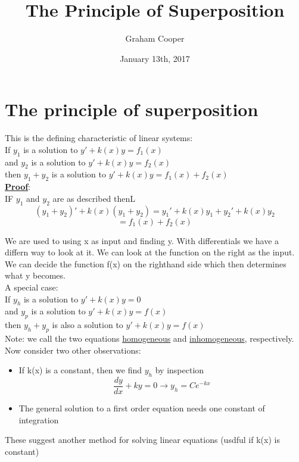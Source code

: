 \documentclass[12pt]{article}
\title{\vspace{-15ex}The Principle of Superposition\vspace{-1ex}}
\date{January 13th, 2017}
\author{Graham Cooper}
\newcommand{\myt}[1]{\textbf{\underline{#1}}}
\begin{document}
	\maketitle
	
	\section*{The principle of superposition}
	This is the defining characteristic of linear systems:\\
	If $y_1$ is a solution to $y' + k(x)y = f_1(x)$\\
	and $y_2$ is a solution to $y' + k(x)y = f_2(x)$\\
	then $y_1 + y_2$ is a solution to $y' + k(x)y = f_1(x) + f_2(x)$\\
	
	\myt{Proof}:\\
	IF $y_1$ and $y_2$ are as described thenL\\
	$$(y_1 + y_2)' + k(x)(y_1 + y_2) = y_1'+k(x)y_1 + y_2' + k(x)y_2$$
	$$ = f_1(x) + f_2(x)$$
	
	We are used to using x as input and finding y. With differentials we have a differn way to look at it. We can look at the function on the right as the input. We can decide the function f(x) on the righthand side which then determines what y becomes.\\
	
	A special case:\\
	If $y_h$ is a solution to $y' + k(x)y = 0$\\
	and $y_p$ is a solution to $y' + k(x)y = f(x)$\\
	then $y_h + y_p$ is also a solution to $y' + k(x)y = f(x)$\\
	
	Note: we call the two equations \underline{homogeneous} and \underline{inhomogeneous}, respectively.\\
	
	Now consider two other observations:\\
	\begin{itemize}
		\item If k(x) is a constant, then we find $y_h$ by inspection
		$$\frac{dy}{dx} + ky = 0 \rightarrow y_h = Ce^{-kx}$$
		\item The general solution to a first order equation needs one constant of integration
	\end{itemize}

	These suggest another method for solving linear equations (usdful if k(x) is constant)\\
	
\end{document}
